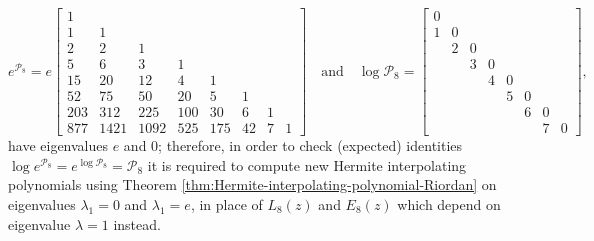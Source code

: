 \begin{example}
\begin{displaymath}
e^{\mathcal{P}_{8}} = e \left[\begin{matrix}1 &   &   &   &   &   &   &  \\1 & 1 &   &   &   &   &   &  \\2 & 2 & 1 &   &   &   &   &  \\5 & 6 & 3 & 1 &   &   &   &  \\15 & 20 & 12 & 4 & 1 &   &   &  \\52 & 75 & 50 & 20 & 5 & 1 &   &  \\203 & 312 & 225 & 100 & 30 & 6 & 1 &  \\877 & 1421 & 1092 & 525 & 175 & 42 & 7 & 1\end{matrix}\right]
\quad\text{and}\quad
\log{\mathcal{P}_{8}} = \left[\begin{matrix} 0 &   &   &   &   &   &   &  \\1 & 0   &   &   &   &   &   &  \\  & 2 &  0  &   &   &   &   &  \\  &   & 3 &  0  &   &   &   &  \\  &   &   & 4 &  0  &   &   &  \\  &   &   &   & 5 &  0  &   &  \\  &   &   &   &   & 6 &  0  &  \\  &   &   &   &   &   & 7 &  0 \end{matrix}\right],
\end{displaymath}
have eigenvalues $e$ and $0$; therefore, in order to check (expected)
identities $\log{e^{\mathcal{P}_{8}}} = e^{\log{\mathcal{P}_{8}}} =
\mathcal{P}_{8}$ it is required to compute new Hermite interpolating
polynomials  using Theorem \ref{thm:Hermite-interpolating-polynomial-Riordan} on
eigenvalues $\lambda_{1}=0$ and $\lambda_{1}=e$, in place of $L_{8}(z)$ and
$E_{8}(z)$ which depend on eigenvalue $\lambda=1$ instead.
\end{example}
